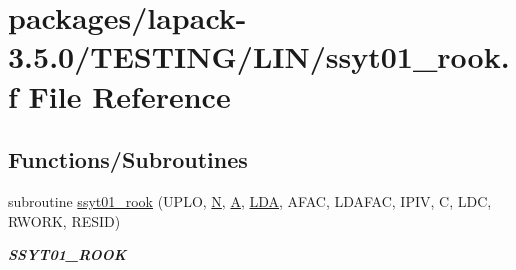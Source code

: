 \hypertarget{ssyt01__rook_8f}{}\section{packages/lapack-\/3.5.0/\+T\+E\+S\+T\+I\+N\+G/\+L\+I\+N/ssyt01\+\_\+rook.f File Reference}
\label{ssyt01__rook_8f}
\subsection*{Functions/\+Subroutines}
\begin{DoxyCompactItemize}
\item 
subroutine \hyperlink{group__single__lin_gad0294a5528ecb962347a117e5e34a5e0}{ssyt01\+\_\+rook} (U\+P\+L\+O, \hyperlink{polmisc_8c_a0240ac851181b84ac374872dc5434ee4}{N}, \hyperlink{classA}{A}, \hyperlink{example__user_8c_ae946da542ce0db94dced19b2ecefd1aa}{L\+D\+A}, A\+F\+A\+C, L\+D\+A\+F\+A\+C, I\+P\+I\+V, C, L\+D\+C, R\+W\+O\+R\+K, R\+E\+S\+I\+D)
\begin{DoxyCompactList}\small\item\em {\bfseries S\+S\+Y\+T01\+\_\+\+R\+O\+O\+K} \end{DoxyCompactList}\end{DoxyCompactItemize}
